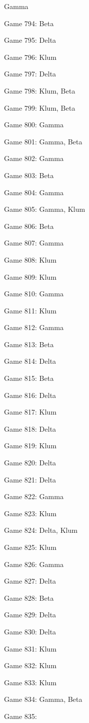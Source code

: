 \documentclass{article}
\begin{document}
\begin{multicols}{3}
\begin{compactitem}
Gamma
\item Game 794:
Beta
\item Game 795:
Delta
\item Game 796:
Klum
\item Game 797:
Delta
\item Game 798:
Klum, Beta
\item Game 799:
Klum, Beta
\item Game 800:
Gamma
\item Game 801:
Gamma, Beta
\item Game 802:
Gamma
\item Game 803:
Beta
\item Game 804:
Gamma
\item Game 805:
Gamma, Klum
\item Game 806:
Beta
\item Game 807:
Gamma
\item Game 808:
Klum
\item Game 809:
Klum
\item Game 810:
Gamma
\item Game 811:
Klum
\item Game 812:
Gamma
\item Game 813:
Beta
\item Game 814:
Delta
\item Game 815:
Beta
\item Game 816:
Delta
\item Game 817:
Klum
\item Game 818:
Delta
\item Game 819:
Klum
\item Game 820:
Delta
\item Game 821:
Delta
\item Game 822:
Gamma
\item Game 823:
Klum
\item Game 824:
Delta, Klum
\item Game 825:
Klum
\item Game 826:
Gamma
\item Game 827:
Delta
\item Game 828:
Beta
\item Game 829:
Delta
\item Game 830:
Delta
\item Game 831:
Klum
\item Game 832:
Klum
\item Game 833:
Klum
\item Game 834:
Gamma, Beta
\item Game 835:

\end{compactitem}
\end{multicols}
\end{document}
